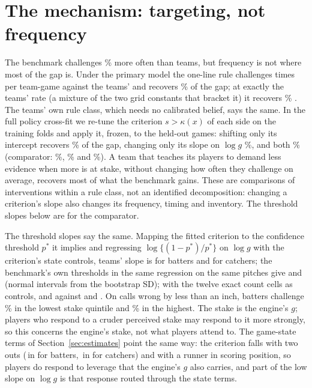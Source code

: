 \documentclass[aoas]{imsart}
\theoremstyle{plain}
\theoremstyle{definition}
\begin{document}
\section{The mechanism: targeting, not frequency}\label{sec:mech}

The benchmark challenges \GapNMorePct\% more often than teams, but frequency is not where most of the gap is. Under the primary model the one-line rule challenges \GapRuleN{} times per team-game against the teams' \GapNObs{} and
recovers \GapRuleGapPct\% of the gap; at exactly the teams' rate (a mixture of the two grid constants that bracket it)
it recovers \GapFMGapPct\% \GapFMGapCI. The teams' own rule class, which needs no calibrated belief, says the same. In the
full policy cross-fit we re-tune the criterion $s>\kappa(x)$ of each side on the training folds and apply it, frozen, to
the held-out games: shifting only its intercept recovers \GapRetuneIntGapPct\% of the gap, changing only its slope on
$\log g$ \GapRetuneSlopeGapPct\%, and both \GapRetuneBothGapPct\% (comparator: \GapMainRetuneIntGapPct\%,
\GapMainRetuneSlopeGapPct\% and \GapMainRetuneBothGapPct\%). A team that teaches its players to demand less evidence when
more is at stake, without changing how often they challenge on average, recovers most of what the benchmark gains. These are comparisons of interventions within a rule class, not an identified decomposition: changing a criterion's
slope also changes its frequency, timing and inventory. The threshold slopes below are for the comparator.

The threshold slopes say the same. Mapping the fitted criterion to the confidence threshold $p^\ast$ it implies and
regressing $\log\{(1-p^\ast)/p^\ast\}$ on $\log g$ with the criterion's state controls, teams' slope is \SlopeTeamBatter{}
\SlopeTeamBatterCI{} for batters and \SlopeTeamCatcher{} \SlopeTeamCatcherCI{} for catchers; the benchmark's own
thresholds in the same regression on the same pitches give \SlopeOptBatter{} \SlopeOptBatterCI{} and
\SlopeOptCatcher{} \SlopeOptCatcherCI{} (normal intervals from the bootstrap SD); with the twelve exact count cells as controls, \SlopeTeamBatterFE{} and
\SlopeTeamCatcherFE{} against \SlopeOptBatterFE{} and \SlopeOptCatcherFE. On calls wrong by less than an inch, batters
challenge \MFRateLowBatter\% in the lowest stake quintile and \MFRateHighBatter\% in the highest. The stake is the
engine's $g$; players who respond to a cruder perceived stake may respond to it more strongly, so this concerns the
engine's stake, not what players attend to. The game-state terms of Section~\ref{sec:estimates} point the same way: the
criterion falls with two outs (\StateTwoOutsBatter\,in for batters, \StateTwoOutsCatcher\,in for catchers) and with a
runner in scoring position, so players do respond to leverage that the engine's $g$ also carries, and part of the low
slope on $\log g$ is that response routed through the state terms.
\end{document}
